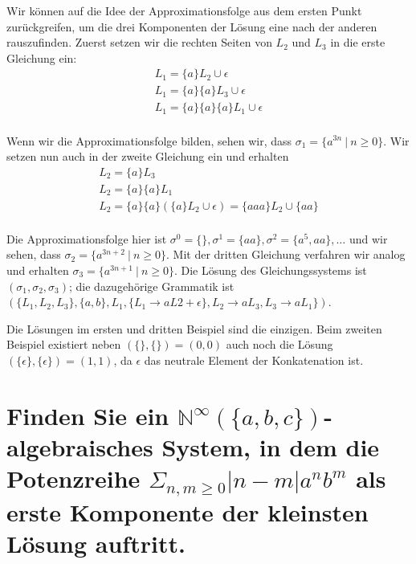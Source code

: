 \documentclass[]{scrartcl}
\newcommand{\grule}[2]{#1 \rightarrow #2}
\newcommand{\grammar}[4]{(#1,#2,#3,#4)}
\begin{document}
\begin{enumerate}
	Wir können auf die Idee der Approximationsfolge aus dem ersten Punkt zurückgreifen, um die drei Komponenten der Lösung eine nach der anderen rauszufinden. Zuerst setzen wir die rechten Seiten von $L_2$ und $L_3$ in die erste Gleichung ein:
	$$
		\begin{array}{l}
		L_1 = \{a\}L_2 \cup \epsilon\\
		L_1 = \{a\}\{a\}L_3 \cup \epsilon\\
		L_1 = \{a\}\{a\}\{a\}L_1 \cup \epsilon\\
		\end{array}
	$$
	
	Wenn wir die Approximationsfolge bilden, sehen wir, dass $\sigma_1 = \{a^{3n}\ |\ n \geq 0\}$.  Wir setzen nun auch in der zweite Gleichung ein und erhalten
	$$
		\begin{array}{l}
		L_2 = \{a\}L_3\\
		L_2 = \{a\}\{a\}L_1\\
		L_2 = \{a\}\{a\}(\{a\}L_2 \cup \epsilon) = \{aaa\}L_2 \cup \{aa\}\\
		\end{array}
	$$
	
	Die Approximationsfolge hier ist $\sigma^0 = \{\}, \sigma^1 = \{aa\}, \sigma^2 = \{a^5, aa\}, \dots$ und wir sehen, dass $\sigma_2 = \{a^{3n+2}\ |\ n \geq 0\}$. Mit der dritten Gleichung verfahren wir analog und erhalten $\sigma_3 = \{a^{3n+1}\ |\ n \geq 0\}$. Die Lösung des Gleichungssystems ist $(\sigma_1,\sigma_2,\sigma_3)$; die dazugehörige Grammatik ist $\grammar{\{L_1,L_2,L_3\}}{\{a,b\}}{L_1}{\{\grule{L_1}{aL2 + \epsilon}\}, \grule{L_2}{aL_3}, \grule{L_3}{aL_1}\}}$.
	
	\medskip
	
	Die Lösungen im ersten und dritten Beispiel sind die einzigen. Beim zweiten Beispiel existiert neben $(\{\},\{\}) = (0,0)$ auch noch die Lösung $(\{\epsilon\},\{\epsilon\}) = (1,1)$, da $\epsilon$ das neutrale Element der Konkatenation ist.
	

\end{enumerate}

\setcounter{section}{13}

\section{Finden Sie ein $\mathbb{N}^\infty(\{a,b,c\})$-algebraisches System, in dem die Potenzreihe $\Sigma_{n,m \geq 0} |n-m|a^nb^m$ als erste Komponente der kleinsten Lösung auftritt.}
\end{document}
